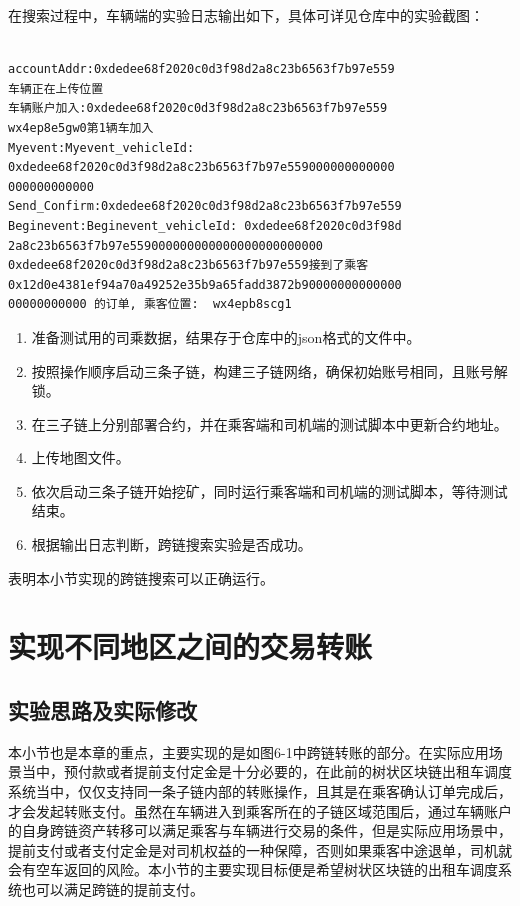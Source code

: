 在搜索过程中，车辆端的实验日志输出如下，具体可详见仓库中的实验截图：

\begin{verbatim}

accountAddr:0xdedee68f2020c0d3f98d2a8c23b6563f7b97e559
车辆正在上传位置
车辆账户加入:0xdedee68f2020c0d3f98d2a8c23b6563f7b97e559
wx4ep8e5gw0第1辆车加入
Myevent:Myevent_vehicleId: 
0xdedee68f2020c0d3f98d2a8c23b6563f7b97e559000000000000
000000000000
Send_Confirm:0xdedee68f2020c0d3f98d2a8c23b6563f7b97e559
Beginevent:Beginevent_vehicleId: 0xdedee68f2020c0d3f98d
2a8c23b6563f7b97e559000000000000000000000000
0xdedee68f2020c0d3f98d2a8c23b6563f7b97e559接到了乘客 
0x12d0e4381ef94a70a49252e35b9a65fadd3872b90000000000000
00000000000 的订单, 乘客位置:  wx4epb8scg1

\end{verbatim}

\begin{enumerate}
    \item 准备测试用的司乘数据，结果存于仓库中的json格式的文件中。
    \item 按照操作顺序启动三条子链，构建三子链网络，确保初始账号相同，且账号解锁。
    \item 在三子链上分别部署合约，并在乘客端和司机端的测试脚本中更新合约地址。
    \item 上传地图文件。
    \item 依次启动三条子链开始挖矿，同时运行乘客端和司机端的测试脚本，等待测试结束。
    \item 根据输出日志判断，跨链搜索实验是否成功。
\end{enumerate}

表明本小节实现的跨链搜索可以正确运行。

\section{实现不同地区之间的交易转账}

\subsection{实验思路及实际修改}

本小节也是本章的重点，主要实现的是如图6-1中跨链转账的部分。在实际应用场景当中，预付款或者提前支付定金是十分必要的，在此前的树状区块链出租车调度系统当中，仅仅支持同一条子链内部的转账操作，且其是在乘客确认订单完成后，才会发起转账支付。虽然在车辆进入到乘客所在的子链区域范围后，通过车辆账户的自身跨链资产转移可以满足乘客与车辆进行交易的条件，但是实际应用场景中，提前支付或者支付定金是对司机权益的一种保障，否则如果乘客中途退单，司机就会有空车返回的风险。本小节的主要实现目标便是希望树状区块链的出租车调度系统也可以满足跨链的提前支付。

